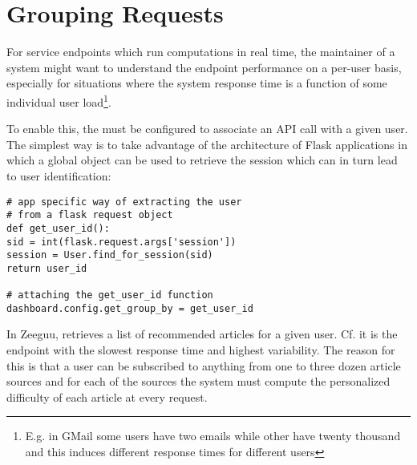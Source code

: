 
\newpage
\section{Grouping Requests}
\label{sec:user}



For service endpoints which run computations in real time, the maintainer of a system might want to understand the endpoint performance on a per-user basis, especially for situations where the system response time is a function of some individual user load\footnote{E.g. in GMail some users have two emails while other have twenty thousand and this induces different response times for different users}.


To enable this, the \tool must be configured to associate an API call with a given user. The simplest way is to take advantage of the architecture of Flask applications in which a global  object can be used to retrieve the session which can in turn lead to user identification: 

\begin{lstlisting}[style=custompython]  
# app specific way of extracting the user
# from a flask request object    
def get_user_id():
sid = int(flask.request.args['session'])
session = User.find_for_session(sid)
return user_id

# attaching the get_user_id function
dashboard.config.get_group_by = get_user_id

\end{lstlisting}




In Zeeguu, \epFeedItems retrieves a list of recommended articles for a given user. Cf.  it is the endpoint with the slowest response time and highest variability. The reason for this is that a user can be subscribed to anything from one to three dozen article sources and for each of the sources the system must compute the personalized difficulty of each article at every request. 


